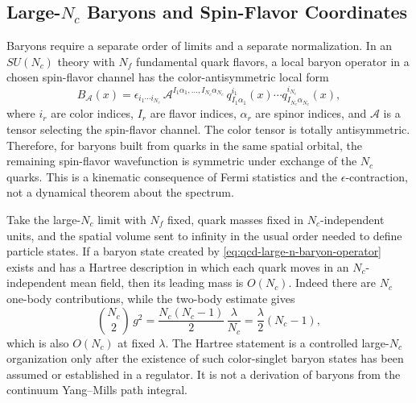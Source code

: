 \subsection{\texorpdfstring{Large-\(N_c\) Baryons and Spin-Flavor Coordinates}{Large-Nc Baryons and Spin-Flavor Coordinates}}
\label{subsec:qcd-large-n-baryon-spin-flavor}

Baryons require a separate order of limits and a separate normalization.  In
an \(SU(N_c)\) theory with \(N_f\) fundamental quark flavors, a local baryon
operator in a chosen spin-flavor channel has the color-antisymmetric local
form
\begin{equation}
  B_{\mathcal A}(x)
  =
  \epsilon_{i_1\cdots i_{N_c}}\,
  \mathcal A^{I_1\alpha_1,\ldots,I_{N_c}\alpha_{N_c}}\,
  q^{i_1}_{I_1\alpha_1}(x)\cdots
  q^{i_{N_c}}_{I_{N_c}\alpha_{N_c}}(x),
  \label{eq:qcd-large-n-baryon-operator}
\end{equation}
where \(i_r\) are color indices, \(I_r\) are flavor indices,
\(\alpha_r\) are spinor indices, and \(\mathcal A\) is a tensor selecting the
spin-flavor channel.  The color tensor is totally antisymmetric.  Therefore,
for baryons built from quarks in the same spatial orbital, the remaining
spin-flavor wavefunction is symmetric under exchange of the \(N_c\) quarks.
This is a kinematic consequence of Fermi statistics and the
\(\epsilon\)-contraction, not a dynamical theorem about the spectrum.

Take the large-\(N_c\) limit with \(N_f\) fixed, quark masses fixed in
\(N_c\)-independent units, and the spatial volume sent to infinity in the
usual order needed to define particle states.  If a baryon state created by
\eqref{eq:qcd-large-n-baryon-operator} exists and has a Hartree description in
which each quark moves in an \(N_c\)-independent mean field, then its leading
mass is \(O(N_c)\).  Indeed there are \(N_c\) one-body contributions, while
the two-body estimate gives
\begin{equation}
  \binom{N_c}{2}\,g^2
  =
  \frac{N_c(N_c-1)}2\,\frac{\lambda}{N_c}
  =
  \frac{\lambda}{2}(N_c-1),
  \label{eq:qcd-large-n-baryon-pair-counting}
\end{equation}
which is also \(O(N_c)\) at fixed \(\lambda\).  The Hartree statement is a
controlled large-\(N_c\) organization only after the existence of such
color-singlet baryon states has been assumed or established in a regulator.
It is not a derivation of baryons from the continuum Yang--Mills path integral.

